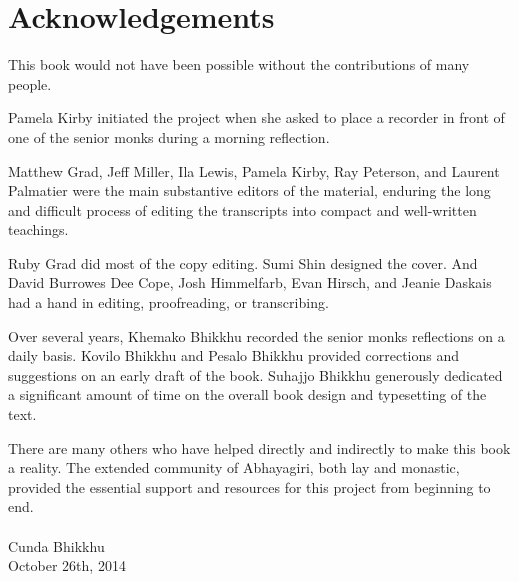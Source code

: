 \chapter{Acknowledgements}

This book would not have been possible without the contributions of many
people.

Pamela Kirby initiated the project when she asked to place a recorder in
front of one of the senior monks during a morning reflection.

Matthew Grad, Jeff Miller, Ila Lewis, Pamela Kirby, Ray Peterson, and
Laurent Palmatier were the main substantive editors of the material,
enduring the long and difficult process of editing the transcripts into
compact and well-written teachings.

Ruby Grad did most of the copy editing. Sumi Shin designed the cover.
And David Burrowes Dee Cope, Josh Himmelfarb, Evan Hirsch, and Jeanie
Daskais had a hand in editing, proofreading, or transcribing.

Over several years, Khemako Bhikkhu recorded the senior monks
reflections on a daily basis. Kovilo Bhikkhu and Pesalo Bhikkhu provided
corrections and suggestions on an early draft of the book. Suhajjo
Bhikkhu generously dedicated a significant amount of time on the overall
book design and typesetting of the text.

There are many others who have helped directly and indirectly to make
this book a reality. The extended community of Abhayagiri, both lay and
monastic, provided the essential support and resources for this project
from beginning to end.\\
\mbox{}\\
Cunda Bhikkhu\\
October 26th, 2014\nowidow[5]


